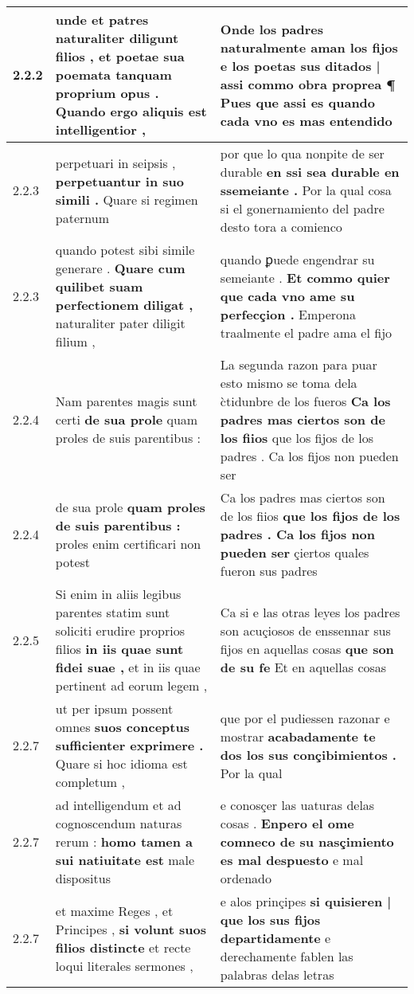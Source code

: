 \begin{tabular}{|p{1cm}|p{6.5cm}|p{6.5cm}|}
2.2.2 & unde et patres naturaliter diligunt filios , \textbf{ et poetae sua poemata tanquam proprium opus . } Quando ergo aliquis est intelligentior , & Onde los padres naturalmente aman los fijos \textbf{ e los poetas sus ditados | assi commo obra proprea ¶ } Pues que assi es quando cada vno es mas entendido \\\hline
2.2.3 & perpetuari in seipsis , \textbf{ perpetuantur in suo simili . } Quare si regimen paternum & por que lo qua nonpite de ser durable \textbf{ en ssi sea durable en ssemeiante . } Por la qual cosa si el gonernamiento del padre desto tora a comienco \\\hline
2.2.3 & quando potest sibi simile generare . \textbf{ Quare cum quilibet suam perfectionem diligat , } naturaliter pater diligit filium , & quando ꝑuede engendrar su semeiante . \textbf{ Et commo quier que cada vno ame su perfecçion . } Emperona traalmente el padre ama el fijo \\\hline
2.2.4 & Nam parentes magis sunt certi \textbf{ de sua prole } quam proles de suis parentibus : & La segunda razon para puar esto mismo se toma dela c̀tidunbre de los fueros \textbf{ Ca los padres mas ciertos son de los fiios } que los fijos de los padres . Ca los fijos non pueden ser \\\hline
2.2.4 & de sua prole \textbf{ quam proles de suis parentibus : } proles enim certificari non potest & Ca los padres mas ciertos son de los fiios \textbf{ que los fijos de los padres . Ca los fijos non pueden ser } çiertos quales fueron sus padres \\\hline
2.2.5 & Si enim in aliis legibus parentes statim sunt soliciti erudire proprios filios \textbf{ in iis quae sunt fidei suae , } et in iis quae pertinent ad eorum legem , & Ca si e las otras leyes los padres son acuçiosos de enssennar sus fijos en aquellas cosas \textbf{ que son de su fe } Et en aquellas cosas \\\hline
2.2.7 & ut per ipsum possent omnes \textbf{ suos conceptus sufficienter exprimere . } Quare si hoc idioma est completum , & que por el pudiessen razonar e mostrar \textbf{ acabadamente te dos los sus conçibimientos . } Por la qual \\\hline
2.2.7 & ad intelligendum et ad cognoscendum naturas rerum : \textbf{ homo tamen a sui natiuitate est } male dispositus & e conosçer las uaturas delas cosas . \textbf{ Enpero el ome comneco de su nasçimiento es mal despuesto } e mal ordenado \\\hline
2.2.7 & et maxime Reges , et Principes , \textbf{ si volunt suos filios distincte } et recte loqui literales sermones , & e alos prinçipes \textbf{ si quisieren | que los sus fijos departidamente } e derechamente fablen las palabras delas letras \\\hline

\end{tabular}
